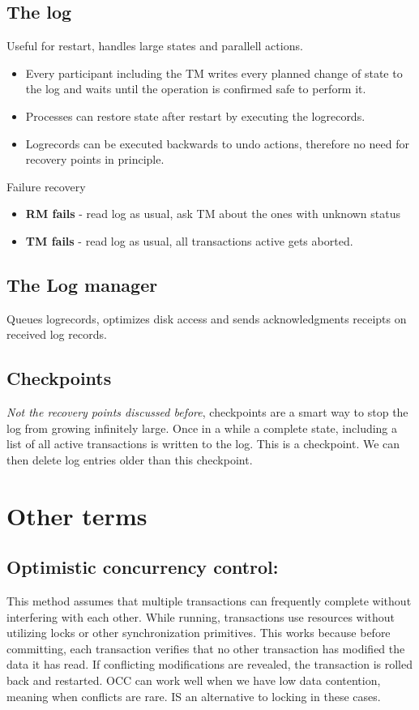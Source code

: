 \subsection{The log}
Useful for restart, handles large states and parallell actions.
\begin{itemize}
\item Every participant including the TM writes every planned change of state to the log and waits until the operation is confirmed safe to perform it. 
\item Processes can restore state after restart by executing the logrecords.
\item Logrecords can be executed backwards to undo actions, therefore no need for recovery points in principle. 
\end{itemize}
Failure recovery
\begin{itemize}
\item \textbf{RM fails} - read log as usual, ask TM about the ones with unknown status
\item \textbf{TM fails} - read log as usual, all transactions active gets aborted.
\end{itemize}

\subsection{The Log manager}
Queues logrecords, optimizes disk access and sends acknowledgments receipts on received log records.

\subsection{Checkpoints}
\textit{Not the recovery points discussed before}, checkpoints are a smart way to stop the log from growing infinitely large. Once in a while a complete state, including a list of all active transactions is written to the log. This is a checkpoint. We can then delete log entries older than this checkpoint.

\section{Other terms}
\subsection{Optimistic concurrency control:}
This method assumes that multiple transactions can frequently complete without interfering with each other. While running, transactions use resources without utilizing locks or other synchronization primitives. This works because before committing, each transaction verifies that no other transaction has modified the data it has read. If conflicting modifications are revealed, the transaction is rolled back and restarted. OCC can work well when we have low data contention, meaning when conflicts are rare. IS an alternative to locking in these cases.

